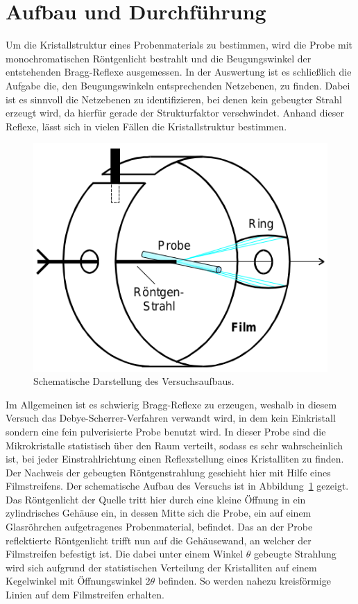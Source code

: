 

\section{Aufbau und Durchführung}

Um die Kristallstruktur eines Probenmaterials zu bestimmen, wird die Probe mit
monochromatischen Röntgenlicht bestrahlt und die Beugungswinkel der
entstehenden Bragg-Reflexe ausgemessen.
In der Auswertung ist es schließlich die Aufgabe die, den Beugungswinkeln
entsprechenden Netzebenen, zu finden. Dabei ist es sinnvoll die Netzebenen zu
identifizieren, bei denen kein gebeugter Strahl erzeugt wird, da hierfür gerade
der Strukturfaktor verschwindet. Anhand dieser Reflexe, lässt sich in vielen
Fällen die Kristallstruktur bestimmen.

\begin{figure}[htpb]
  \centering
  \includegraphics[scale=0.5]{bilder/aufbau.png}
  \caption{Schematische Darstellung des Versuchsaufbaus.}
\label{fig:aufbau}
\end{figure}

Im Allgemeinen ist es schwierig Bragg-Reflexe zu erzeugen, weshalb in diesem
Versuch das Debye-Scherrer-Verfahren verwandt wird, in dem kein Einkristall
sondern eine fein pulverisierte Probe benutzt wird.
In dieser Probe sind die Mikrokristalle statistisch über den Raum verteilt,
sodass es sehr wahrscheinlich ist, bei jeder Einstrahlrichtung einen
Reflexstellung eines Kristalliten zu finden.
Der Nachweis der gebeugten Röntgenstrahlung geschieht hier mit Hilfe eines
Filmstreifens.
Der schematische Aufbau des Versuchs ist in Abbildung~\ref{fig:aufbau} gezeigt.
Das Röntgenlicht der Quelle tritt hier durch eine kleine Öffnung in ein
zylindrisches Gehäuse ein, in dessen Mitte sich die Probe, ein auf einem
Glasröhrchen aufgetragenes Probenmaterial, befindet.
Das an der Probe reflektierte Röntgenlicht trifft nun auf die Gehäusewand, an
welcher der Filmstreifen befestigt ist. Die dabei unter einem Winkel $\theta$
gebeugte Strahlung wird sich aufgrund der statistischen Verteilung der
Kristalliten auf einem Kegelwinkel mit Öffnungswinkel $2\theta$ befinden.
So werden nahezu kreisförmige Linien auf dem Filmstreifen erhalten.

